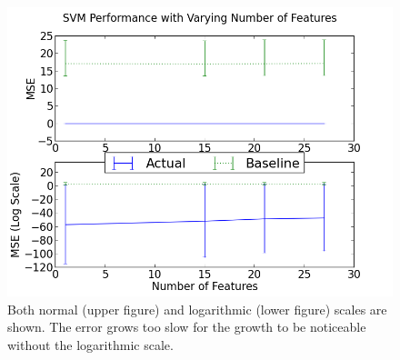 \documentclass[12pt,notitlepage,twoside]{scrreprt}
\begin{document}
\begin{figure}[h!]
\centering
  \includegraphics[width=\linewidth]{figs/svm_feats.png}
  \caption{Both normal (upper figure) and logarithmic (lower figure)  scales are shown.
  The error grows too slow for the growth to be noticeable without the logarithmic scale.
  \label{svm_feats}}
\end{figure}
\end{document}
